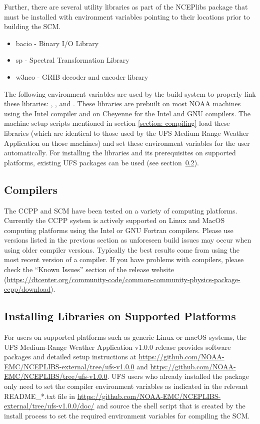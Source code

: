 Further, there are several utility libraries as part of the NCEPlibs package that must be installed with environment variables pointing to their locations prior to building the SCM.
\begin{itemize}
    \item bacio - Binary I/O Library
    \item sp - Spectral Transformation Library
    \item w3nco - GRIB decoder and encoder library
\end{itemize}
The following environment variables are used by the build system to properly link these libraries: , , and .  These libraries are prebuilt on most NOAA machines using the Intel compiler and on Cheyenne for the Intel and GNU compilers. The machine setup scripts mentioned in section \ref{section: compiling} load these libraries (which are identical to those used by the UFS Medium Range Weather Application on those machines) and set these environment variables for the user automatically. For installing the libraries and its prerequisites on supported platforms, existing UFS packages can be used (see section~\ref{section: setup_supported_platforms}).

\subsection{Compilers}
The CCPP and SCM have been tested on a variety of
computing platforms. Currently the CCPP system is actively supported
on Linux and MacOS computing platforms using the Intel or GNU Fortran
compilers. Please use versions listed in the previous section as unforeseen
build issues may occur when using older compiler versions. Typically the best results come from using the
most recent version of a compiler. If you have problems with compilers, please check the ``Known Issues'' section of the
release website (\url{https://dtcenter.org/community-code/common-community-physics-package-ccpp/download}).

\subsection{Installing Libraries on Supported Platforms}\label{section: setup_supported_platforms}
For users on supported platforms such as generic Linux or macOS systems, the UFS Medium-Range Weather Application v1.0.0 release provides software packages and detailed setup instructions at \url{https://github.com/NOAA-EMC/NCEPLIBS-external/tree/ufs-v1.0.0} and \url{https://github.com/NOAA-EMC/NCEPLIBS/tree/ufs-v1.0.0}. UFS users who already installed the  package only need to set the compiler environment variables as indicated in the relevant README\_*.txt file in \url{https://github.com/NOAA-EMC/NCEPLIBS-external/tree/ufs-v1.0.0/doc/} and source the shell script that is created by the  install process to set the required environment variables for compiling the SCM.

